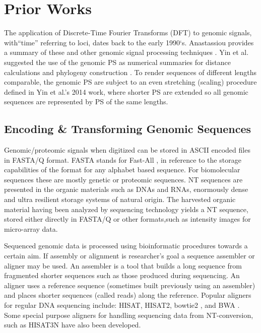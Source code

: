 \documentclass[10pt,conference]{IEEEtran}
\begin{document}
\vspace{-0.5 em}
\section{Prior Works}
\label{sec:pw}
\noindent The application of Discrete-Time Fourier Transforms (DFT) to genomic signals, with``time'' referring to loci, dates back to the early 1990`s.  
Anastassiou provides a summary of these and other genomic signal processing techniques \cite{Ana01}.
Yin et al. suggested the use of the genomic PS as numerical summaries for distance calculations and phylogeny construction
\cite{yin20, yin14, yin15,pei19,Hoa15}.
To render sequences of different lengths comparable, the genomic PS are subject to an even stretching (scaling) procedure defined in Yin et al.'s 2014 work, 
where shorter PS are extended so all genomic sequences are represented by PS of the same lengths. 

\subsection{Encoding \& Transforming Genomic Sequences}
\noindent Genomic/proteomic signals when digitized can be stored in ASCII encoded files in FASTA/Q format.  
FASTA stands for Fast-All  \cite{Lip85}, in reference to the storage capabilities of the format for any alphabet based sequence.
For biomolecular sequences these are mostly genetic or proteomic sequences.  
NT sequences are presented in the organic materials such as DNAs and RNAs, enormously dense and ultra resilient storage systems of natural origin. 
The harvested organic material having been analyzed by sequencing technology \cite{Met10} \cite{Sla18} yields a NT sequence, stored either directly in FASTA/Q or other formats,such as intensity images for micro-array data. 

Sequenced genomic data is processed using bioinformatic procedures towards a certain aim. 
If assembly or alignment is researcher's goal a sequence assembler or aligner may be used.  
An assembler is a tool that builds a long sequence from fragmented shorter sequences such as those produced during sequencing.
An aligner uses a reference sequence (sometimes built previously using an assembler) and places shorter sequences (called reads)
 along the reference.
Popular aligners for regular DNA sequencing include: HISAT, \cite{kim15} HISAT2\cite{Kim19}, bowtie2 \cite{lan12}, and BWA \cite{li09}.
Some special purpose aligners for handling sequencing data from NT-conversion, such as HISAT3N \cite{Zha20} have also been developed.
\end{document}

